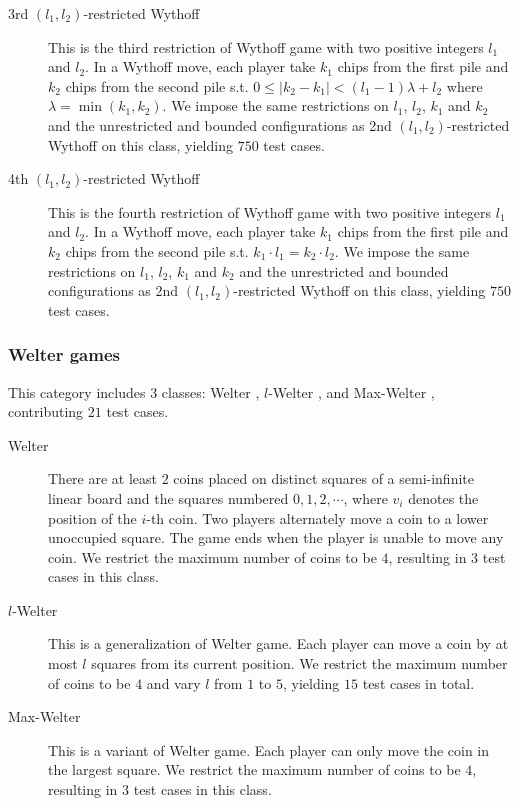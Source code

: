 \documentclass[review]{elsarticle}
\begin{document}
\begin{description}
	\item[3rd $(l_1, l_2)$-restricted Wythoff]
	This is the third restriction of Wythoff game with two positive integers $l_1$ and $l_2$.
	In a Wythoff move, each player take $k_1$ chips from the first pile and $k_2$ chips from the second pile s.t. $0 \le |k_2 - k_1| < (l_1 - 1) \lambda + l_2$ where $\lambda = \min(k_1, k_2)$.
	We impose the same restrictions on $l_1$, $l_2$, $k_1$ and $k_2$ and the unrestricted and bounded configurations as 2nd $(l_1, l_2)$-restricted Wythoff on this class, yielding $750$ test cases.
	
	\item[4th $(l_1, l_2)$-restricted Wythoff]
	This is the fourth restriction of Wythoff game with two positive integers $l_1$ and $l_2$.
	In a Wythoff move, each player take $k_1$ chips from the first pile and $k_2$ chips from the second pile s.t. $ k_1 \cdot l_1 = k_2 \cdot l_2$.
	We impose the same restrictions on $l_1$, $l_2$, $k_1$ and $k_2$ and the unrestricted and bounded configurations as 2nd $(l_1, l_2)$-restricted Wythoff on this class, yielding $750$ test cases.
\end{description}

%
%


\subsubsection{Welter games}
This category includes $3$ classes: Welter \cite{Wel1952}, $l$-Welter \cite{KahF1987}, and Max-Welter \cite{Ho2014}, contributing $21$ test cases.

\begin{description}
	\item[Welter] There are at least $2$ coins placed on distinct squares of a semi-infinite linear board and the squares numbered $0, 1, 2, \cdots$, where $v_i$ denotes the position of the $i$-th coin.
	Two players alternately move a coin to a lower unoccupied square. 
	The game ends when the player is unable to move any coin.
	We restrict the maximum number of coins to be $4$, resulting in $3$ test cases in this class.
	
	\item[$l$-Welter] This is a generalization of Welter game.
	Each player can move a coin by at most $l$ squares from its current position.
	We restrict the maximum number of coins to be $4$ and vary $l$ from $1$ to $5$, yielding $15$ test cases in total.
	
	\item[Max-Welter] This is a variant of Welter game.
	Each player can only move the coin in the largest square.
	We restrict the maximum number of coins to be $4$, resulting in $3$ test cases in this class.
\end{description}
\end{document}
